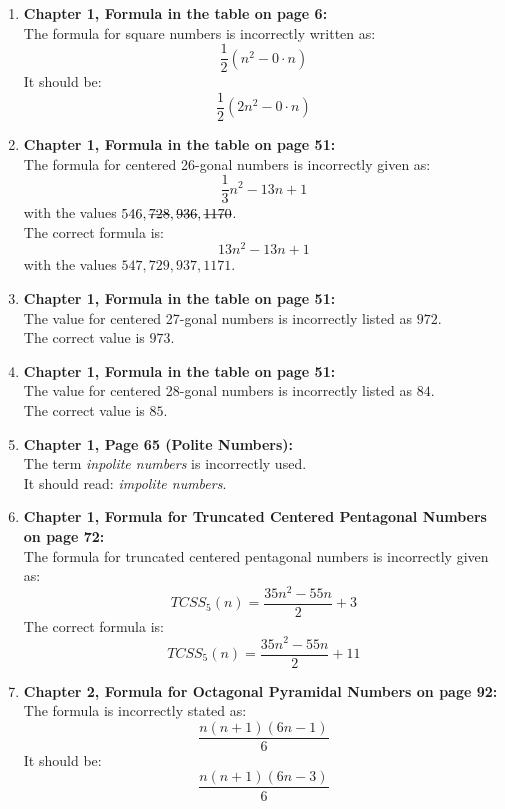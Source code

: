 \documentclass[10pt, a4paper]{article}
\begin{document}
\begin{enumerate}
  \item \textbf{Chapter 1, Formula in the table on page 6:} \\
        The formula for square numbers is incorrectly written as:
        \[
          \frac{1}{2} (n^2 - 0 \cdot n)
        \]
        It should be:
        \[
          \frac{1}{2} (2n^2 - 0 \cdot n)
        \]

  \item \textbf{Chapter 1, Formula in the table on page 51:} \\
        The formula for centered 26-gonal numbers is incorrectly given as:
        \[
          \frac{1}{3}n^2 - 13n + 1
        \]
        with the values \( 546, \text{\sout{728}}, \text{\sout{936}}, \text{\sout{1170}} \). \\
        The correct formula is:
        \[
          13n^2 - 13n + 1
        \]
        with the values \( 547, 729, 937, 1171 \).

  \item \textbf{Chapter 1, Formula in the table on page 51:} \\
        The value for centered 27-gonal numbers is incorrectly listed as \(972\). \\
        The correct value is \(973\).

  \item \textbf{Chapter 1, Formula in the table on page 51:} \\
        The value for centered 28-gonal numbers is incorrectly listed as \(84\). \\
        The correct value is \(85\).

  \item \textbf{Chapter 1, Page 65 (Polite Numbers):} \\
        The term \emph{inpolite numbers} is incorrectly used. \\
        It should read: \emph{impolite numbers}.

  \item \textbf{Chapter 1, Formula for Truncated Centered Pentagonal Numbers on page 72:} \\
        The formula for truncated centered pentagonal numbers is incorrectly given as:
        \[
          TCSS_5(n) = \frac{35n^2 - 55n}{2} + 3
        \]
        The correct formula is:
        \[
          TCSS_5(n) = \frac{35n^2 - 55n}{2} + 11
        \]

  \item \textbf{Chapter 2, Formula for Octagonal Pyramidal Numbers on page 92:} \\
        The formula is incorrectly stated as:
        \[
          \frac{n(n+1)(6n-1)}{6}
        \]
        It should be:
        \[
          \frac{n(n+1)(6n-3)}{6}
        \]


\end{enumerate}
\end{document}
